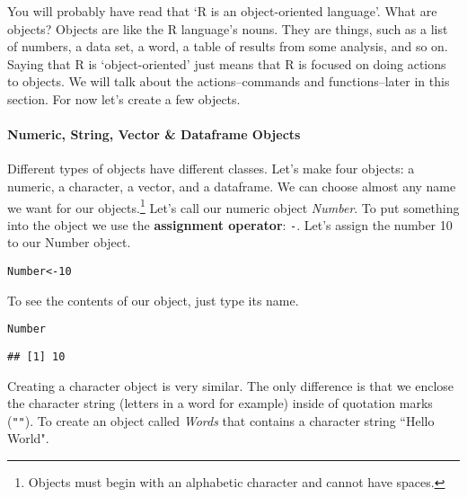 \documentclass[ChapterTOCs,krantz1]{krantz}\usepackage{graphicx, color}
\makeatletter
\newenvironment{kframe}{%
 \def\at@end@of@kframe{}%
 \ifinner\ifhmode%
  \def\at@end@of@kframe{\end{minipage}}%
  \begin{minipage}{\columnwidth}%
 \fi\fi%
 \def\FrameCommand##1{\hskip\@totalleftmargin \hskip-\fboxsep
 \colorbox{shadecolor}{##1}\hskip-\fboxsep
     \hskip-\linewidth \hskip-\@totalleftmargin \hskip\columnwidth}%
 \MakeFramed {\advance\hsize-\width
   \@totalleftmargin\z@ \linewidth\hsize
   \@setminipage}}%
 {\par\unskip\endMakeFramed%
 \at@end@of@kframe}
\newenvironment{knitrout}{}{} %
\makeatother
\begin{document}
You will probably have read that `R is an object-oriented language'.  What are objects? Objects are like the R language's nouns. They are things, such as a list of numbers, a data set, a word, a table of results from some analysis, and so on. Saying that R is `object-oriented' just means that R is focused on doing actions to objects. We will talk about the actions--commands and functions--later in this section. For now let's create a few objects.

\paragraph{Numeric, String, Vector \& Dataframe Objects}

Different types of objects have different classes. Let's make four objects: a numeric, a character, a vector, and a dataframe. We can choose almost any name we want for our objects.\footnote{Objects must begin with an alphabetic character and cannot have spaces.} Let's call our numeric object {\emph{Number}}. To put something into the object we use the {\bf{assignment operator}}: {\tt{\lessthan-}}. Let's assign the number 10 to our Number object.

\begin{knitrout}
\color{fgcolor}\begin{kframe}
\begin{alltt}
Number <- 10
\end{alltt}
\end{kframe}
\end{knitrout}


\noindent To see the contents of our object, just type its name.

\begin{knitrout}
\color{fgcolor}\begin{kframe}
\begin{alltt}
Number
\end{alltt}
\begin{verbatim}
## [1] 10
\end{verbatim}
\end{kframe}
\end{knitrout}


\noindent Creating a character object is very similar. The only difference is that we enclose the character string (letters in a word for example) inside of quotation marks ({\tt{""}}). To create an object called {\emph{Words}} that contains a character string ``Hello World".
\end{document}
